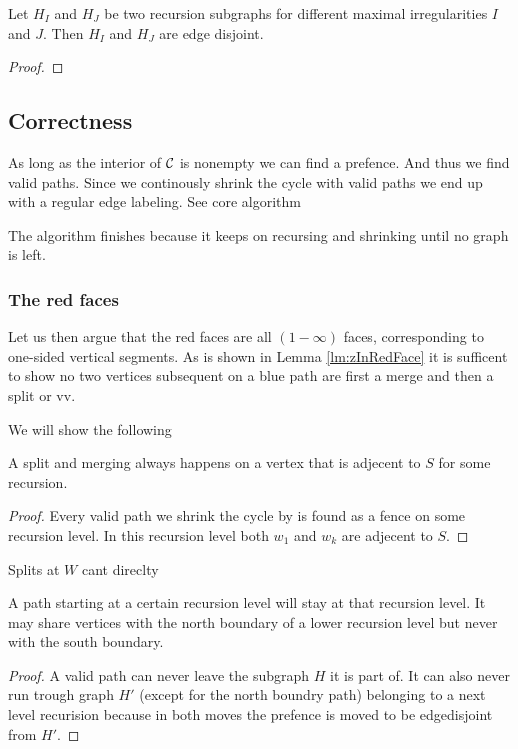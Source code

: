 \begin{lemma}
Let $H_I$ and $H_J$ be two recursion subgraphs for different maximal irregularities $I$ and $J$. Then $H_I$ and $H_J$ are edge disjoint.
\end{lemma}
\begin{proof}
\end{proof}


\subsection{Correctness}
As long as the interior of $\mathcal{C}$ is nonempty we can find a prefence. And thus we find valid paths. Since we continously shrink the cycle with valid paths we end up with a regular edge labeling.
See core algorithm

The algorithm finishes because it keeps on recursing and shrinking until no graph is left.

\subsubsection{The red faces}
Let us then argue that the red faces are all $(1-\infty)$ faces, corresponding to one-sided vertical segments. As is shown in Lemma \ref{lm:zInRedFace} it is sufficent to show no two vertices subsequent on a blue path are first a merge and then a split or vv.

We will show the following
\begin{lemma}
  A split and merging always happens on a vertex that is adjecent to $S$ for some recursion.
\end{lemma}

\begin{proof}
  Every valid path we shrink the cycle by is found as a fence on some recursion level. In this recursion level both $w_1$ and $w_k$ are adjecent to $S$.
\end{proof}
Splits at $W$ cant direclty

\begin{lemma}
  \label{lm:pathsStayOnRecursionLevel}
  A path starting at a certain recursion level will stay at that recursion level. It may share vertices with the north boundary of a lower recursion level but never with the south boundary.
\end{lemma}
\begin{proof}
  A valid path can never leave the subgraph $H$ it is part of. It can also never run trough graph $H'$ (except for the north boundry path) belonging to a next level recurision because in both moves the prefence is moved to be edgedisjoint from $H'$.
\end{proof}


